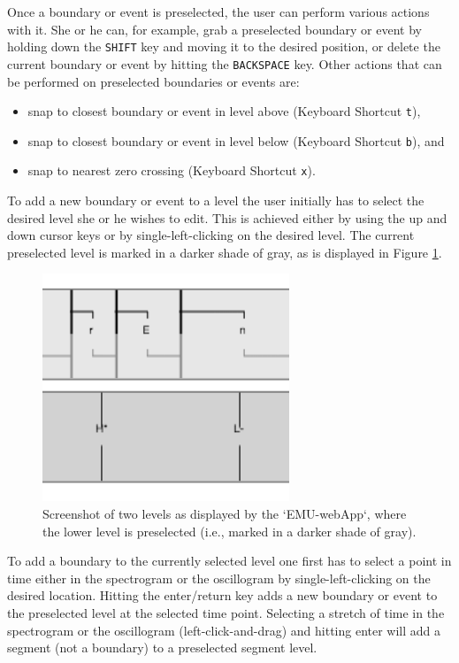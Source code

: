 \documentclass[]{book}
\providecommand{\tightlist}{%
  \setlength{\itemsep}{0pt}\setlength{\parskip}{0pt}}
\begin{document}
Once a boundary or event is preselected, the user can perform various actions with it. She or he can, for example, grab a preselected boundary or event by holding down the \texttt{SHIFT} key and moving it to the desired position, or delete the current boundary or event by hitting the \texttt{BACKSPACE} key. Other actions that can be performed on preselected boundaries or events are:

\begin{itemize}
\tightlist
\item
  snap to closest boundary or event in level above (Keyboard Shortcut \texttt{t}),
\item
  snap to closest boundary or event in level below (Keyboard Shortcut \texttt{b}), and
\item
  snap to nearest zero crossing (Keyboard Shortcut \texttt{x}).
\end{itemize}

To add a new boundary or event to a level the user initially has to select the desired level she or he wishes to edit. This is achieved either by using the up and down cursor keys or by single-left-clicking on the desired level. The current preselected level is marked in a darker shade of gray, as is displayed in Figure \ref{fig:webApp-selectLevel}.

\begin{figure}

{\centering \includegraphics[width=0.4\linewidth]{pics/selectLevel} 

}

\caption{Screenshot of two levels as displayed by the `EMU-webApp`, where the lower level is preselected (i.e., marked in a darker shade of gray).}\label{fig:webApp-selectLevel}
\end{figure}

To add a boundary to the currently selected level one first has to select a point in time either in the spectrogram or the oscillogram by single-left-clicking on the desired location. Hitting the enter/return key adds a new boundary or event to the preselected level at the selected time point. Selecting a stretch of time in the spectrogram or the oscillogram (left-click-and-drag) and hitting enter will add a segment (not a boundary) to a preselected segment level.
\end{document}
